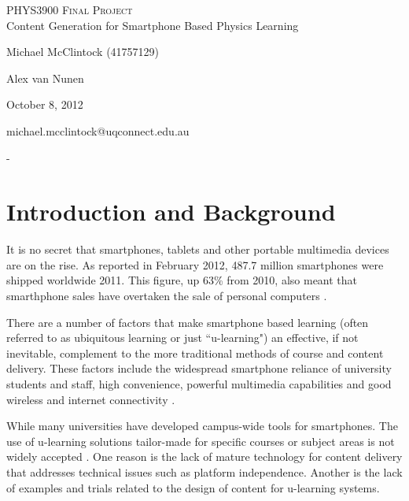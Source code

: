 \documentclass[12pt,a4paper]{article}  %
\begin{document}
\begin{titlepage}
\begin{center}
\textsc{\LARGE PHYS3900 Final Project}\\[1cm]
{\LARGE Content Generation for Smartphone Based Physics Learning}\\[2cm]
\begin{minipage}[t]{0.6\columnwidth} \large
\begin{description}
\itemsep2mm
\small
\item [\emph{Author:}] Michael McClintock (41757129)
\item [\emph{Partner:}] Alex van Nunen
\item [\emph{Date:}] October 8, 2012
\item [\emph{Email:}] michael.mcclintock@uqconnect.edu.au
\item [\emph{Supervisors:}] -
\end{description}
\end{minipage}
\vfill
\end{center}
\end{titlepage}

\section*{Introduction and Background}

It is no secret that smartphones, tablets and other portable
multimedia devices are on the rise. As reported in February 2012,
487.7 million smartphones were shipped worldwide 2011.  This figure,
up 63\% from 2010, also meant that smarthphone sales have overtaken
the sale of personal computers \cite{canalys}. 

There are a number of factors that make smartphone based learning
(often referred to as ubiquitous learning or just ``u-learning") an
effective, if not inevitable, complement to the more traditional
methods of course and content delivery. These factors include the
widespread smartphone reliance of university students and staff, high
convenience, powerful multimedia capabilities and good wireless and
internet connectivity \cite{worry}.

While many universities have developed campus-wide tools for
smartphones. The use of u-learning solutions tailor-made for specific
courses or subject areas is not widely accepted \cite{procsmart}.
One reason is the lack of mature technology for content delivery that
addresses technical issues such as platform independence. Another is the
lack of examples and trials related to the design of content for
u-learning systems.
\end{document}
